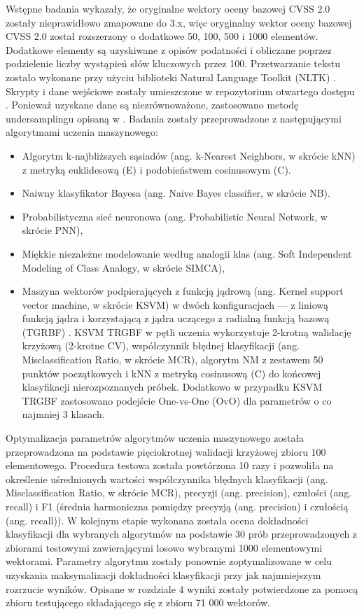 \bigbreak
Wstępne badania wykazały, że oryginalne wektory oceny bazowej CVSS 2.0 zostały nieprawidłowo zmapowane do 3.x, więc oryginalny wektor oceny bazowej CVSS 2.0 został rozszerzony o dodatkowe 50, 100, 500 i 1000 elementów. Dodatkowe elementy są uzyskiwane z opisów podatności i obliczane poprzez podzielenie liczby wystąpień słów kluczowych przez 100. Przetwarzanie tekstu zostało wykonane przy użyciu biblioteki Natural Language Toolkit (NLTK) \cite{bird2009natural}. Skrypty i dane wejściowe zostały umieszczone w repozytorium otwartego dostępu \cite{cvss-2-extended-vector-database-github}. Ponieważ uzyskane dane są niezrównoważone, zastosowano metodę undersamplingu opisaną w \cite{Nowak-cldd-2021}. Badania zostały przeprowadzone z następującymi algorytmami uczenia maszynowego:
\begin{itemize}
\item Algorytm k-najbliższych sąsiadów (ang. k-Nearest Neighbors, w skrócie kNN) z metryką euklidesową (E) i podobieństwem cosinusowym (C).
\item Naiwny klasyfikator Bayesa (ang. Naive Bayes classifier, w skrócie NB).
\item Probabilistyczna sieć neuronowa (ang. Probabilistic Neural Network, w skrócie PNN),
\item Miękkie niezależne modelowanie według analogii klas (ang. Soft Independent Modeling of Class Analogy, w skrócie SIMCA),
\item Maszyna wektorów podpierających z funkcją jądrową (ang. Kernel support vector machine, w skrócie KSVM) w dwóch konfiguracjach — z liniową funkcją jądra i korzystającą z jądra uczącego z radialną funkcją bazową (TGRBF) \cite{nowak2019recognition}. KSVM TRGBF w pętli uczenia wykorzystuje 2-krotną walidację krzyżową (2-krotne CV), współczynnik błędnej klasyfikacji (ang. Misclassification Ratio, w skrócie MCR), algorytm NM z zestawem 50 punktów początkowych i kNN z metryką cosinusową (C) do końcowej klasyfikacji nierozpoznanych próbek. Dodatkowo w przypadku KSVM TRGBF zastosowano podejście One-vs-One (OvO) dla parametrów o co najmniej 3 klasach.
\end{itemize}

Optymalizacja parametrów algorytmów uczenia maszynowego została przeprowadzona na podstawie pięciokrotnej walidacji krzyżowej zbioru 100 elementowego. Procedura testowa została powtórzona 10 razy i pozwoliła na określenie uśrednionych wartości współczynnika błędnych klasyfikacji (ang. Misclassification Ratio, w skrócie MCR), precyzji (ang. precision), czułości (ang. recall) i F1 (średnia harmoniczna pomiędzy precyzją (ang. precision) i czułością (ang. recall)). W kolejnym etapie wykonana została ocena dokładności klasyfikacji dla wybranych algorytmów na podstawie 30 prób przeprowadzonych z zbiorami testowymi zawierającymi losowo wybranymi 1000 elementowymi wektorami. Parametry algorytmu zostały ponownie zoptymalizowane w celu uzyskania maksymalizacji dokładności klasyfikacji przy jak najmniejszym rozrzucie wyników. Opisane w rozdziale 4 wyniki zostały potwierdzone za pomocą zbioru testującego składającego się z zbioru 71 000 wektorów.

